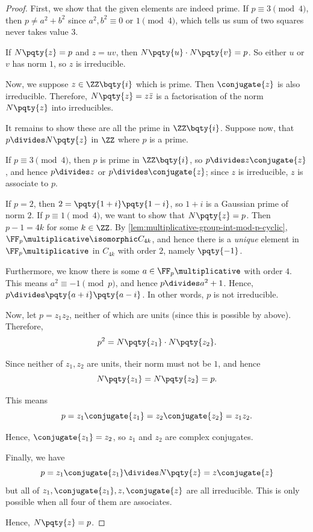\begin{proof}
    First, we show that the given elements are indeed prime. If \(p \equiv 3 \pmod{4}\), then \(p \neq a^2 + b^2\) since \(a^2, b^2 \equiv 0 \text{ or } 1 \pmod{4}\), which tells us sum of two squares never takes value \(3\).

    If \(N\pqty{z} = p\) and \(z = uv\), then \(N\pqty{u} \cdot N\pqty{v} = p\). So either \(u\) or \(v\) has norm \(1\), so \(z\) is irreducible.

    Now, we suppose \(z \in \ZZ\bqty{i}\) which is prime. Then \(\conjugate{z}\) is also irreducible. Therefore, \(N\pqty{z} = z \bar{z}\) is a factorisation of the norm \(N\pqty{z}\) into irreducibles.

    It remains to show these are all the prime in \(\ZZ\bqty{i}\). Suppose now, that \(p \divides N\pqty{z}\) in \(\ZZ\) where \(p\) is a prime.
    
    If \(p \equiv 3 \pmod{4}\), then \(p\) is prime in \(\ZZ\bqty{i}\), so \(p \divides z\conjugate{z}\), and hence \(p \divides z\) or \(p \divides \conjugate{z}\); since \(z\) is irreducible, \(z\) is associate to \(p\).

    If \(p = 2\), then \(2 = \pqty{1 + i}\pqty{1 - i}\), so \(1 + i\) is a Gaussian prime of norm \(2\). If \(p \equiv 1 \pmod{4}\), we want to show that \(N\pqty{z} = p\). Then \(p - 1 = 4k\) for some \(k \in \ZZ\). By \autoref{lem:multiplicative-group-int-mod-p-cyclic}, \(\FF_p\multiplicative \isomorphic C_{4k}\), and hence there is a \emph{unique} element in \(\FF_p\multiplicative\) in \(C_{4k}\) with order \(2\), namely \(\pqty{-1}\).

    Furthermore, we know there is some \(a \in \FF_p\multiplicative\) with order \(4\). This means \(a^2 \equiv -1 \pmod{p}\), and hence \(p \divides a^2 + 1\). Hence, \(p \divides \pqty{a + i} \pqty{a - i}\). In other words, \(p\) is not irreducible.

    Now, let \(p = z_1 z_2\), neither of which are units (since this is possible by above). Therefore,
    \[
        p^2 = N\pqty{z_1} \cdot N\pqty{z_2}.
    \]
    
    Since neither of \(z_1, z_2\) are units, their norm must not be \(1\), and hence
    \[
        N\pqty{z_1} = N\pqty{z_2} = p.
    \]

    This means
    \[
        p = z_1 \conjugate{z_1} = z_2 \conjugate{z_2} = z_1 z_2.
    \]

    Hence, \(\conjugate{z_1} = z_2\), so \(z_1\) and \(z_2\) are complex conjugates.

    Finally, we have
    \[
        p = z_1 \conjugate{z_1} \divides N\pqty{z} = z \conjugate{z}
    \]
    but all of \(z_1, \conjugate{z_1}, z, \conjugate{z}\) are all irreducible. This is only possible when all four of them are associates.

    Hence, \(N\pqty{z} = p\).
\end{proof}

